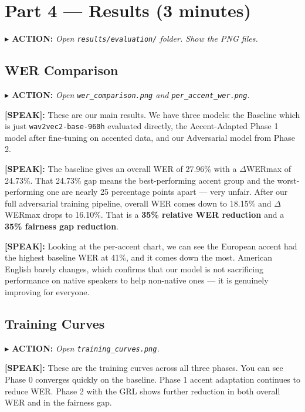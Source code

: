 \documentclass[12pt,a4paper]{article}
\newcommand{\say}[1]{%
  \begin{speakbox}
  \textbf{\color{speakblue}[SPEAK]:} #1
  \end{speakbox}
  \vspace{4pt}
}
\newcommand{\action}[1]{%
  \vspace{2pt}
  \noindent\textbf{\color{sectionred}$\blacktriangleright$ ACTION:} \textit{#1}
  \vspace{4pt}
}
\begin{document}
\section{Part 4 --- Results (3 minutes)}

\action{Open \texttt{results/evaluation/} folder. Show the PNG files.}

\subsection{WER Comparison}

\action{Open \texttt{wer\_comparison.png} and \texttt{per\_accent\_wer.png}.}

\say{These are our main results. We have three models: the Baseline which is just
\texttt{wav2vec2-base-960h} evaluated directly, the Accent-Adapted Phase 1 model after
fine-tuning on accented data, and our Adversarial model from Phase 2.}

\say{The baseline gives an overall WER of 27.96\% with a $\Delta$WERmax of 24.73\%. That
24.73\% gap means the best-performing accent group and the worst-performing one are nearly
25 percentage points apart --- very unfair. After our full adversarial training pipeline,
overall WER comes down to 18.15\% and $\Delta$WERmax drops to 16.10\%. That is a
\textbf{35\% relative WER reduction} and a \textbf{35\% fairness gap reduction}.}

\say{Looking at the per-accent chart, we can see the European accent had the highest baseline
WER at 41\%, and it comes down the most. American English barely changes, which confirms
that our model is not sacrificing performance on native speakers to help non-native ones ---
it is genuinely improving for everyone.}

\subsection{Training Curves}

\action{Open \texttt{training\_curves.png}.}

\say{These are the training curves across all three phases. You can see Phase 0 converges
quickly on the baseline. Phase 1 accent adaptation continues to reduce WER. Phase 2 with
the GRL shows further reduction in both overall WER and in the fairness gap.}

\end{document}
